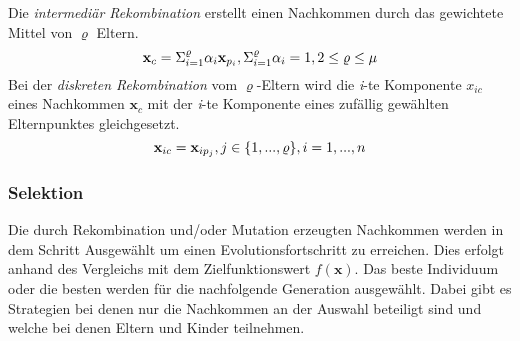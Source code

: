 Die \textit{intermediär Rekombination} erstellt einen Nachkommen durch das gewichtete Mittel von $\varrho$ Eltern.
%
\begin{equation}
\mathbf{x}_c = \Sigma^\varrho_{i=1} \alpha_i\mathbf{x}_{p_i},\\ \Sigma^\varrho_{i=1} \alpha_i = 1,\\ 2\leq\varrho\leq\mu
\end{equation} 
%
Bei der \textit{diskreten Rekombination} vom $\varrho$-Eltern wird die \textit{i}-te Komponente $x_{ic}$ eines Nachkommen $\mathbf{x}_c$ mit der \textit{i}-te Komponente eines zufällig gewählten Elternpunktes gleichgesetzt.
%
\begin{equation}
\mathbf{x}_{ic} = \mathbf{x}_{ip_j},\\ j\in\{1,...,\varrho\},\\i=1,...,n
\end{equation} 
%
\subsubsection[Selektion]{Selektion}
Die durch Rekombination und/oder Mutation erzeugten Nachkommen werden in dem Schritt Ausgewählt um einen Evolutionsfortschritt zu erreichen. Dies erfolgt anhand des Vergleichs mit dem Zielfunktionswert $f(\mathbf{x})$. Das beste Individuum oder die besten werden für die nachfolgende Generation ausgewählt. Dabei gibt es Strategien bei denen nur die Nachkommen an der Auswahl beteiligt sind und welche bei denen Eltern und Kinder teilnehmen.

